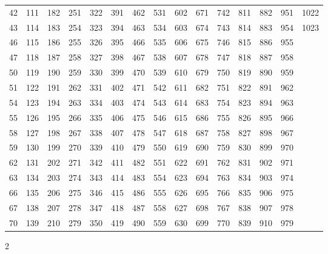 \documentclass{assignment}
\begin{document}
\begin{tabular}{r r r r r r r r r r r r r r r}
42 & 111 & 182 & 251 & 322 & 391 & 462 & 531 & 602 & 671 & 742 & 811 & 882 & 951 & 1022 \\
43 & 114 & 183 & 254 & 323 & 394 & 463 & 534 & 603 & 674 & 743 & 814 & 883 & 954 & 1023 \\
46 & 115 & 186 & 255 & 326 & 395 & 466 & 535 & 606 & 675 & 746 & 815 & 886 & 955 \\
47 & 118 & 187 & 258 & 327 & 398 & 467 & 538 & 607 & 678 & 747 & 818 & 887 & 958 \\
50 & 119 & 190 & 259 & 330 & 399 & 470 & 539 & 610 & 679 & 750 & 819 & 890 & 959 \\
51 & 122 & 191 & 262 & 331 & 402 & 471 & 542 & 611 & 682 & 751 & 822 & 891 & 962 \\
54 & 123 & 194 & 263 & 334 & 403 & 474 & 543 & 614 & 683 & 754 & 823 & 894 & 963 \\
55 & 126 & 195 & 266 & 335 & 406 & 475 & 546 & 615 & 686 & 755 & 826 & 895 & 966 \\
58 & 127 & 198 & 267 & 338 & 407 & 478 & 547 & 618 & 687 & 758 & 827 & 898 & 967 \\
59 & 130 & 199 & 270 & 339 & 410 & 479 & 550 & 619 & 690 & 759 & 830 & 899 & 970 \\
62 & 131 & 202 & 271 & 342 & 411 & 482 & 551 & 622 & 691 & 762 & 831 & 902 & 971 \\
63 & 134 & 203 & 274 & 343 & 414 & 483 & 554 & 623 & 694 & 763 & 834 & 903 & 974 \\
66 & 135 & 206 & 275 & 346 & 415 & 486 & 555 & 626 & 695 & 766 & 835 & 906 & 975 \\
67 & 138 & 207 & 278 & 347 & 418 & 487 & 558 & 627 & 698 & 767 & 838 & 907 & 978 \\
70 & 139 & 210 & 279 & 350 & 419 & 490 & 559 & 630 & 699 & 770 & 839 & 910 & 979 \\
\end{tabular}
\newpage


2\\
\\
\end{document}
